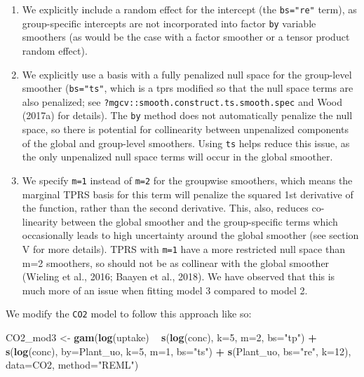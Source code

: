 \documentclass[12pt]{article}
\newenvironment{Shaded}{\begin{snugshade}}{\end{snugshade}}
\newcommand{\KeywordTok}[1]{\textcolor[rgb]{0.13,0.29,0.53}{\textbf{#1}}}
\newcommand{\DataTypeTok}[1]{\textcolor[rgb]{0.13,0.29,0.53}{#1}}
\newcommand{\DecValTok}[1]{\textcolor[rgb]{0.00,0.00,0.81}{#1}}
\newcommand{\StringTok}[1]{\textcolor[rgb]{0.31,0.60,0.02}{#1}}
\newcommand{\OperatorTok}[1]{\textcolor[rgb]{0.81,0.36,0.00}{\textbf{#1}}}
\newcommand{\NormalTok}[1]{#1}
\providecommand{\tightlist}{%
  \setlength{\itemsep}{0pt}\setlength{\parskip}{0pt}}
\begin{document}
\begin{enumerate}
\def\labelenumi{\arabic{enumi}.}
\tightlist
\item
  We explicitly include a random effect for the intercept (the
  \texttt{bs="re"} term), as group-specific intercepts are not
  incorporated into factor \texttt{by} variable smoothers (as would be
  the case with a factor smoother or a tensor product random effect).
\item
  We explicitly use a basis with a fully penalized null space for the
  group-level smoother (\texttt{bs="ts"}, which is a tprs modified so
  that the null space terms are also penalized; see
  \texttt{?mgcv::smooth.construct.ts.smooth.spec} and Wood (2017a) for
  details). The \texttt{by} method does not automatically penalize the
  null space, so there is potential for collinearity between unpenalized
  components of the global and group-level smoothers. Using \texttt{ts}
  helps reduce this issue, as the only unpenalized null space terms will
  occur in the global smoother.
\item
  We specify \texttt{m=1} instead of \texttt{m=2} for the groupwise
  smoothers, which means the marginal TPRS basis for this term will
  penalize the squared 1st derivative of the function, rather than the
  second derivative. This, also, reduces co-linearity between the global
  smoother and the group-specific terms which occasionally leads to high
  uncertainty around the global smoother (see section V for more
  details). TPRS with \texttt{m=1} have a more restricted null space
  than m=2 smoothers, so should not be as collinear with the global
  smoother (Wieling et al., 2016; Baayen et al., 2018). We have observed
  that this is much more of an issue when fitting model 3 compared to
  model 2.
\end{enumerate}

We modify the \texttt{CO2} model to follow this approach like so:

\begin{Shaded}
\begin{Highlighting}[]
\NormalTok{CO2_mod3 <-}\StringTok{ }\KeywordTok{gam}\NormalTok{(}\KeywordTok{log}\NormalTok{(uptake) }\OperatorTok{~}\StringTok{ }\KeywordTok{s}\NormalTok{(}\KeywordTok{log}\NormalTok{(conc), }\DataTypeTok{k=}\DecValTok{5}\NormalTok{, }\DataTypeTok{m=}\DecValTok{2}\NormalTok{, }\DataTypeTok{bs=}\StringTok{"tp"}\NormalTok{) }\OperatorTok{+}
\StringTok{                  }\KeywordTok{s}\NormalTok{(}\KeywordTok{log}\NormalTok{(conc), }\DataTypeTok{by=}\NormalTok{Plant_uo, }\DataTypeTok{k=}\DecValTok{5}\NormalTok{, }\DataTypeTok{m=}\DecValTok{1}\NormalTok{, }\DataTypeTok{bs=}\StringTok{"ts"}\NormalTok{) }\OperatorTok{+}
\StringTok{                  }\KeywordTok{s}\NormalTok{(Plant_uo, }\DataTypeTok{bs=}\StringTok{"re"}\NormalTok{, }\DataTypeTok{k=}\DecValTok{12}\NormalTok{),}
                \DataTypeTok{data=}\NormalTok{CO2, }\DataTypeTok{method=}\StringTok{"REML"}\NormalTok{)}
\end{Highlighting}
\end{Shaded}
\end{document}
